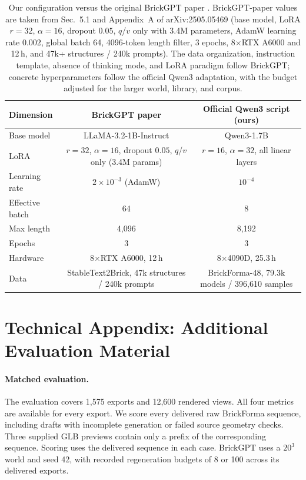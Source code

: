 \documentclass[letterpaper]{article} %
\begin{document}
\begin{table}[!htbp]
\centering
\small
\setlength{\tabcolsep}{5pt}
\begin{tabular}{lcc}
\toprule
Dimension & BrickGPT paper & Official Qwen3 script (ours) \\
\midrule
Base model & LLaMA-3.2-1B-Instruct & Qwen3-1.7B \\
LoRA & $r=32$, $\alpha=16$, dropout $0.05$, $q$/$v$ only (3.4M params) & $r=16$, $\alpha=32$, all linear layers \\
Learning rate & $2{\times}10^{-3}$ (AdamW) & $10^{-4}$ \\
Effective batch & 64 & 8 \\
Max length & 4,096 & 8,192 \\
Epochs & 3 & 3 \\
Hardware & 8$\times$RTX A6000, 12\,h & 8$\times$4090D, 25.3\,h \\
Data & StableText2Brick, 47k structures / 240k prompts & BrickForma-48, 79.3k models / 396,610 samples \\
\bottomrule
\end{tabular}
\caption{Our configuration versus the original BrickGPT paper \cite{brickgpt}. BrickGPT-paper values are taken from Sec.~5.1 and Appendix~A of arXiv:2505.05469 (base model, LoRA $r{=}32$, $\alpha{=}16$, dropout $0.05$, $q$/$v$ only with 3.4M parameters, AdamW learning rate $0.002$, global batch 64, 4096-token length filter, 3 epochs, 8$\times$RTX A6000 and 12\,h, and 47k+ structures / 240k prompts). The data organization, instruction template, absence of thinking mode, and LoRA paradigm follow BrickGPT; concrete hyperparameters follow the official Qwen3 adaptation, with the budget adjusted for the larger world, library, and corpus.}
\label{tab:brickgpt-recipe}
\end{table}


\section{Technical Appendix: Additional Evaluation Material}
\label{app:eval}

\paragraph{Matched evaluation.}

The evaluation covers 1,575 exports and 12,600 rendered views. All four metrics are available for every export. We score every delivered raw BrickForma sequence, including drafts with incomplete generation or failed source geometry checks. Three supplied GLB previews contain only a prefix of the corresponding sequence. Scoring uses the delivered sequence in each case. BrickGPT uses a $20^3$ world and seed 42, with recorded regeneration budgets of 8 or 100 across its delivered exports.
\end{document}
